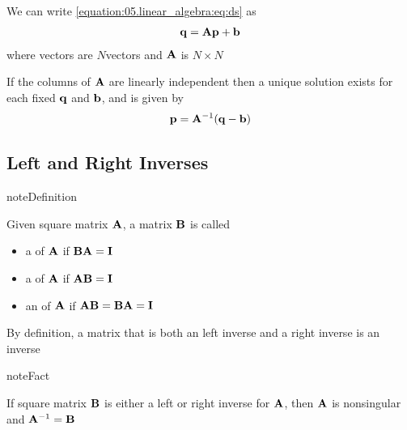 \documentclass[letterpaper,10pt,english]{jupyterBook}
\begin{document}
\sphinxAtStartPar
We can write \eqref{equation:05.linear_algebra:eq:ds} as
\begin{equation*}
\begin{split}
%
{\bf q} = {\bf A} {\bf p} + {\bf b}
%
\end{split}
\end{equation*}
\sphinxAtStartPar
where vectors are \(N\)\sphinxhyphen{}vectors and \({\bf A}\) is \(N \times N\)

\sphinxAtStartPar
If the columns of \({\bf A}\) are linearly independent then a unique solution
exists for each fixed \({\bf q}\) and \({\bf b}\), and is given by
\begin{equation*}
\begin{split}
%
{\bf p} = {\bf A}^{-1} ({\bf q} - {\bf b})
%
\end{split}
\end{equation*}

\subsection{Left and Right Inverses}
\label{\detokenize{05.linear_algebra:left-and-right-inverses}}
\begin{sphinxadmonition}{note}{Definition}

\sphinxAtStartPar
Given square matrix \({\bf A}\), a matrix \({\bf B}\) is called
\begin{itemize}
\item {} 
\sphinxAtStartPar
a  of \({\bf A}\) if \({\bf B} {\bf A} = {\bf I}\)

\item {} 
\sphinxAtStartPar
a  of \({\bf A}\) if \({\bf A} {\bf B} = {\bf I}\)

\item {} 
\sphinxAtStartPar
an  of \({\bf A}\) if \({\bf A} {\bf B} = {\bf B} {\bf A} = {\bf I}\)

\end{itemize}
\end{sphinxadmonition}

\sphinxAtStartPar
By definition, a matrix that is both an left inverse and a right inverse is an inverse

\begin{sphinxadmonition}{note}{Fact}

\sphinxAtStartPar
If square matrix \({\bf B}\) is either a left or right inverse for
\({\bf A}\), then \({\bf A}\) is nonsingular and \({\bf A}^{-1} = {\bf B}\)
\end{sphinxadmonition}
\end{document}
